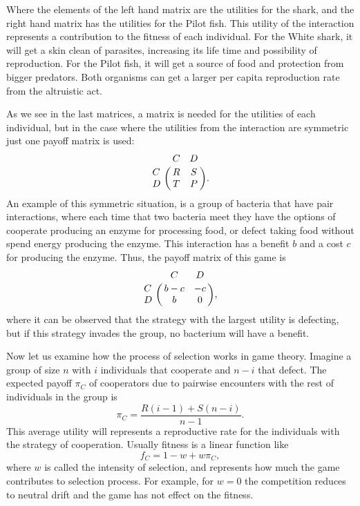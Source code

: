 Where the elements of the left hand matrix are the utilities for the shark,  and the right hand matrix has the utilities for the Pilot fish. This utility of the interaction represents a contribution to the fitness of each individual. For the White shark, it will get a skin clean of parasites, increasing its life time and possibility of reproduction. For the Pilot fish, it will get a source of food and protection from bigger predators. Both organisms can get a larger per capita reproduction rate from the altruistic act.

As we see in the last matrices, a matrix  is needed  for the utilities of each individual, but in the case where the utilities from the interaction are symmetric just one payoff matrix  is used:
\begin{equation}\label{5.1}
\bordermatrix{~ & C & D \cr
             C & R & S \cr
              D & T & P \cr}. 
\end{equation}
An example of this symmetric situation, is  a group of bacteria that have pair interactions, where each time that two bacteria meet they have the options of cooperate producing an enzyme for processing food, or defect taking food without  spend energy producing the enzyme. This interaction has a benefit $b$ and a cost $c$ for producing the enzyme. Thus, the  payoff matrix of this game is
\begin{equation*}
\bordermatrix{~ & C & D \cr
             C & b-c & -c \cr
              D & b & 0\cr}, 
\end{equation*}
where it can be observed that the strategy with the largest utility is defecting, but if this strategy invades the group, no bacterium will have a benefit.

Now let us examine how the process of selection works in game theory. Imagine a group of size $n$ with $i$ individuals that cooperate and $n-i$ that defect. The expected payoff $\pi_{C}$ of cooperators due to pairwise encounters with the rest of individuals in the group is
\begin{equation}
 \pi_{C}=\frac{R(i-1)+S(n-i)}{n-1}.
\end{equation}
This average utility will represents a reproductive rate for the individuals with the strategy of cooperation. Usually fitness is  a linear function like
\begin{equation}
f_{C}=1-w+w\pi_{C},
\end{equation}
where $w$ is called the intensity of selection, and represents how much the game contributes to selection process. For example, for $w=0$ the competition reduces to neutral drift and the game has not effect on the fitness.



